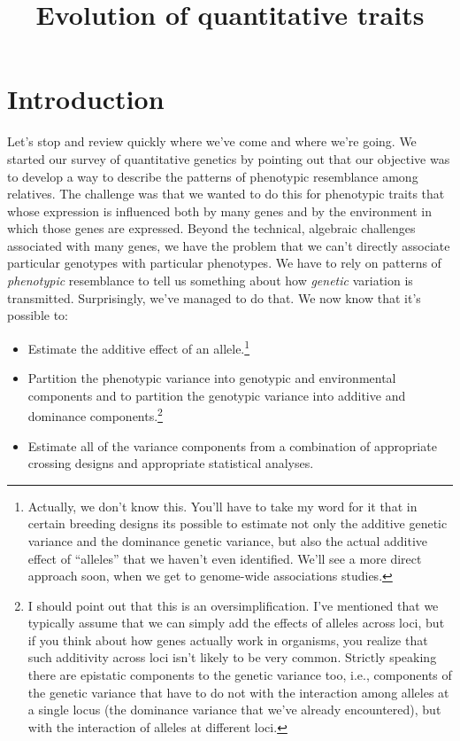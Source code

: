 \documentclass[12pt]{article}
\title{Evolution of quantitative traits}
\begin{document}
\maketitle

\thispagestyle{first}

\section*{Introduction}

Let's stop and review quickly where we've come and where we're
going. We started our survey of quantitative genetics by pointing out
that our objective was to develop a way to describe the patterns of
phenotypic resemblance among relatives. The challenge was that we
wanted to do this for phenotypic traits that whose expression is
influenced both by many genes and by the environment in which those
genes are expressed. Beyond the technical, algebraic challenges
associated with many genes, we have the problem that we can't directly
associate particular genotypes with particular phenotypes. We have to
rely on patterns of {\it phenotypic\/} resemblance to tell us
something about how {\it genetic\/} variation is
transmitted. Surprisingly, we've managed to do that. We now know that
it's possible to:

\begin{itemize}

\item Estimate the additive effect of an allele.\footnote{Actually, we
    don't know this. You'll have to take my word for it that in
    certain breeding designs its possible to estimate not only the
    additive genetic variance and the dominance genetic variance, but
    also the actual additive effect of ``alleles'' that we haven't
    even identified. We'll see a more direct approach soon, when we
    get to genome-wide associations studies.}

\item Partition the phenotypic variance into genotypic and
  environmental components and to partition the genotypic variance
  into additive and dominance components.\footnote{I should point out
    that this is an oversimplification. I've mentioned that we
    typically assume that we can simply add the effects of alleles
    across loci, but if you think about how genes actually work in
    organisms, you realize that such additivity across loci isn't
    likely to be very common. Strictly speaking there are epistatic
    components to the genetic variance too, i.e., components of the
    genetic variance that have to do not with the interaction among
    alleles at a single locus (the dominance variance that we've
    already encountered), but with the interaction of alleles at
    different loci.}

\item Estimate all of the variance components from a combination of
appropriate crossing designs and appropriate statistical analyses.

\end{itemize}
\end{document}
